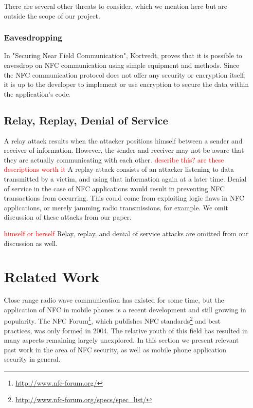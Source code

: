 \documentclass[12pt]{article}
\newcommand\TODO[1]{\textcolor{red}{#1}}
\newcommand\todo[1]{\textcolor{red}{#1}}
\begin{document}
There are several other threats to consider, which we mention here but are outside the scope of our project.

\subsubsection{Eavesdropping}
In "Securing Near Field Communication"\cite{kortvedt2009}, Kortvedt, proves that it is possible to eavesdrop on NFC communication using simple equipment and methods.
Since the NFC communication protocol does not offer any security or encryption itself, it is up to the developer to implement or use encryption to secure the data within the application's code. 
\subsection{Relay, Replay, Denial of Service}
A relay attack results when the attacker positions himself between a sender and receiver of information.
However, the sender and receiver may not be aware that they are actually communicating with each other.
\TODO{describe this? are these descriptions worth it}
A replay attack consists of an attacker listening to data transmitted by a victim, and using that information again at a later time.
Denial of service in the case of NFC applications would result in preventing NFC transactions from occurring.
This could come from exploiting logic flaws in NFC applications, or merely jamming radio transmissions, for example.
We omit discussion of these attacks from our paper.

\todo{himself or herself}
Relay, replay, and denial of service attacks are omitted from our discussion as well.

\section{Related Work}
Close range radio wave communication has existed for some time, but the application of NFC in mobile phones is a recent development and still growing in popularity.
The NFC Forum\footnote{\url{http://www.nfc-forum.org/}}, which publishes NFC standards\footnote{\url{http://www.nfc-forum.org/specs/spec_list/}} and best practices, was only formed in 2004.
The relative youth of this field has resulted in many aspects remaining largely unexplored.
In this section we present relevant past work in the area of NFC security, as well as mobile phone application security in general.
\end{document}
